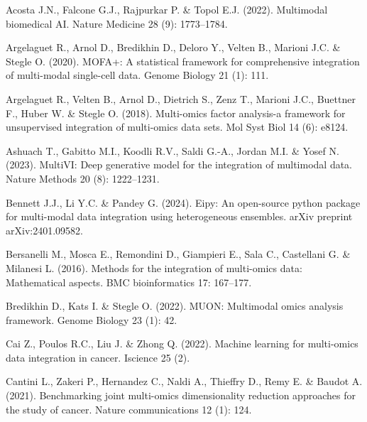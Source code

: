 \documentclass[
]{article}
\newlength{\cslhangindent}
\newlength{\cslentryspacingunit} %
\newenvironment{CSLReferences}[2] %
 {%
  \setlength{\parindent}{0pt}
  \ifodd #1
  \let\oldpar\par
  \def\par{\hangindent=\cslhangindent\oldpar}
  \fi
  \setlength{\parskip}{#2\cslentryspacingunit}
 }%
 {}
\begin{document}
\hypertarget{refs}{}
\begin{CSLReferences}{1}{0}
\leavevmode{}%
Acosta J.N., Falcone G.J., Rajpurkar P. \& Topol E.J. (2022). Multimodal biomedical AI. Nature Medicine 28 (9): 1773--1784.

\leavevmode{}%
Argelaguet R., Arnol D., Bredikhin D., Deloro Y., Velten B., Marioni J.C. \& Stegle O. (2020). MOFA+: A statistical framework for comprehensive integration of multi-modal single-cell data. Genome Biology 21 (1): 111.

\leavevmode{}%
Argelaguet R., Velten B., Arnol D., Dietrich S., Zenz T., Marioni J.C., Buettner F., Huber W. \& Stegle O. (2018). Multi-omics factor analysis-a framework for unsupervised integration of multi-omics data sets. Mol Syst Biol 14 (6): e8124.

\leavevmode{}%
Ashuach T., Gabitto M.I., Koodli R.V., Saldi G.-A., Jordan M.I. \& Yosef N. (2023). MultiVI: Deep generative model for the integration of multimodal data. Nature Methods 20 (8): 1222--1231.

\leavevmode{}%
Bennett J.J., Li Y.C. \& Pandey G. (2024). Eipy: An open-source python package for multi-modal data integration using heterogeneous ensembles. arXiv preprint arXiv:2401.09582.

\leavevmode{}%
Bersanelli M., Mosca E., Remondini D., Giampieri E., Sala C., Castellani G. \& Milanesi L. (2016). Methods for the integration of multi-omics data: Mathematical aspects. BMC bioinformatics 17: 167--177.

\leavevmode{}%
Bredikhin D., Kats I. \& Stegle O. (2022). MUON: Multimodal omics analysis framework. Genome Biology 23 (1): 42.

\leavevmode{}%
Cai Z., Poulos R.C., Liu J. \& Zhong Q. (2022). Machine learning for multi-omics data integration in cancer. Iscience 25 (2).

\leavevmode{}%
Cantini L., Zakeri P., Hernandez C., Naldi A., Thieffry D., Remy E. \& Baudot A. (2021). Benchmarking joint multi-omics dimensionality reduction approaches for the study of cancer. Nature communications 12 (1): 124.


\end{CSLReferences}
\end{document}
